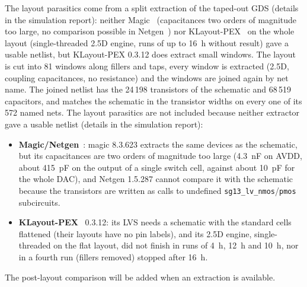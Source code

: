 \ifdefined\PexBitEA
The layout parasitics come from a split extraction of the taped-out GDS (details in the simulation
report): neither Magic~\cite{magic} (capacitances two orders of magnitude too large, no comparison
possible in Netgen~\cite{netgen}) nor KLayout-PEX~\cite{kpex} on the whole layout (single-threaded
2.5D engine, runs of up to \SI{16}{h} without result) gave a usable netlist, but KLayout-PEX 0.3.12
does extract small windows. The layout is cut into 81 windows along fillers and taps, every window is
extracted (2.5D, coupling capacitances, no resistance) and the windows are joined again by net name.
The joined netlist has the 24\,198 transistors of the schematic and 68\,519 capacitors, and matches
the schematic in the transistor widths on every one of its 572 named nets.
\else
The layout parasitics are not included because neither extractor gave a usable netlist (details in the
simulation report):
\begin{itemize}
  \item \textbf{Magic/Netgen}~\cite{magic,netgen}: magic 8.3.623 extracts the same devices as the
        schematic, but its capacitances are two orders of magnitude too large (\SI{4.3}{nF} on AVDD,
        about \SI{415}{pF} on the output of a single switch cell, against about \SI{10}{pF} for the whole
        DAC), and Netgen 1.5.287 cannot compare it with the schematic because the transistors are
        written as calls to undefined \texttt{sg13\_lv\_nmos}/\texttt{pmos} subcircuits.
  \item \textbf{KLayout-PEX}~\cite{kpex} 0.3.12: its LVS needs a schematic with the standard cells
        flattened (their layouts have no pin labels), and its 2.5D engine, single-threaded on the flat
        layout, did not finish in runs of \SI{4}{h}, \SI{12}{h} and \SI{10}{h}, nor in a fourth run (fillers
        removed) stopped after \SI{16}{h}.
\end{itemize}
The post-layout comparison will be added when an extraction is available.
\fi

